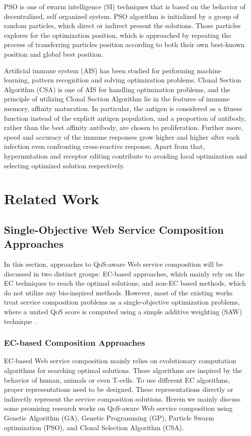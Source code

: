 PSO is one of swarm intelligence (SI) techniques that is based on the behavior of decentralized, self organized system. PSO algorithm is initialized by a group of random particles, which direct or indirect present the solutions. Those particles explores for the optimization position, which is approached by repeating the process of transferring particles position according to both their own best-known position and global best position.

Artificial immune system (AIS) has been studied for performing machine learning, pattern recognition and solving optimization problems.  Clonal Section Algorithm (CSA) is one of AIS for handling optimization problems, and the principle of utilizing Clonal Section Algorithm lie in the features of immune memory, affinity maturation. In particular, the antigen is considered as a fitness function instead of the explicit antigen population, and a proportion of antibody, rather than the best affinity antibody, are chosen to proliferation. Further more, speed and accuracy of the immune responses grow higher and higher after each infection even confronting cross-reactive response. Apart from that, hypermutation and receptor editing contribute to avoiding local optimization and selecting optimized solution respectively. 


\section{Related Work}\label{related}

\subsection{Single-Objective Web Service Composition Approaches}\label{singleobjective}

In this section, approaches to QoS-aware Web service composition will be discussed in two distinct groups: EC-based approaches, which mainly rely on the EC techniques to reach the optimal solutions, and non-EC based methods, which do not utilize any bio-inspired methods. However, most of the existing works treat service composition problems as a single-objective optimization problems, where a united QoS score is computed using a simple additive weighting (SAW) technique \cite{hwang1981lecture}.
\subsubsection{EC-based Composition Approaches}
EC-based Web service composition mainly relies on evolutionary computation algorithms for searching optimal solutions. These algorithms are inspired by the behavior of human, animals or even T-cells. To use different EC algorithms, proper representations need to be designed. These representations directly or indirectly represent the service composition solutions. Herein we mainly discuss some promising research works on QoS-aware Web service composition using  Genetic Algorithm (GA), Genetic Programming (GP), Particle Swarm optimization (PSO), and Clonal Selection Algorithm (CSA).

